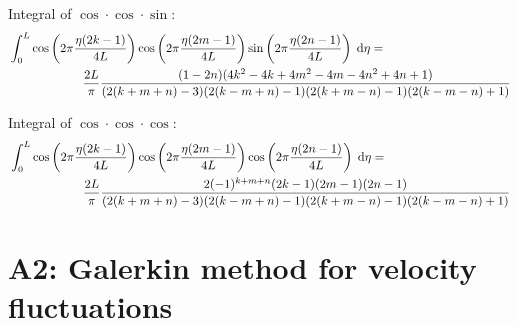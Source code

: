 Integral of $\cos \cdot \cos \cdot \sin$:
~
\begin{equation*}
\begin{split}
    & \int^L_0 \cos\left( 2 \pi \frac{\eta (2 k - 1)}{4 L} \right)
    \cos\left( 2 \pi \frac{\eta (2 m - 1)}{4 L} \right)
    \sin\left( 2 \pi \frac{\eta (2 n - 1)}{4 L} \right) \;\mathrm{d}\eta =
    \\ & \qquad \qquad \qquad
    \frac{2 L}{\pi} \frac{
    (1 - 2n)(4k^2 - 4k + 4m^2 - 4m - 4n^2 + 4n + 1)
    }{
    (2(k+m+n)-3)(2(k-m+n)-1)(2(k+m-n)-1)(2(k-m-n)+1)
    }
\end{split}
\end{equation*}

Integral of $\cos \cdot \cos \cdot \cos$:
~
\begin{equation*}
\begin{split}
    & \int^L_0 \cos\left( 2 \pi \frac{\eta (2 k - 1)}{4 L} \right)
    \cos\left( 2 \pi \frac{\eta (2 m - 1)}{4 L} \right)
    \cos\left( 2 \pi \frac{\eta (2 n - 1)}{4 L} \right) \;\mathrm{d}\eta =
    \\ & \qquad \qquad \qquad
    \frac{2 L}{\pi} \frac{
    2(-1)^{k+m+n}(2k - 1)(2m - 1)(2n - 1)
    }{
    (2(k+m+n)-3)(2(k-m+n)-1)(2(k+m-n)-1)(2(k-m-n)+1)
    }
\end{split}
\end{equation*}

\section*{A2: Galerkin method for velocity fluctuations}


